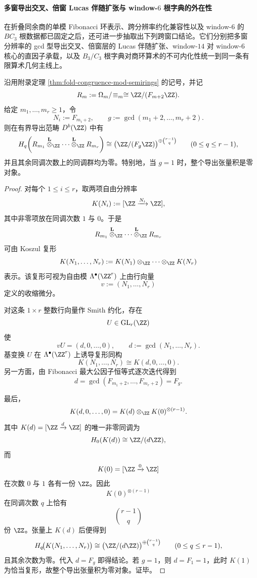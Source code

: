 \paragraph{多窗导出交叉、倍窗 Lucas 伴随扩张与 window-\texorpdfstring{$6$}{6} 根字典的外在性}
在折叠同余商的单模 Fibonacci 环表示、跨分辨率约化兼容性以及 window-\(6\) 的 \(BC_3\) 根数据都已固定之后，还可进一步抽取出下列跨窗口结论。它们分别把多窗分辨率的 gcd 型导出交叉、倍窗层的 Lucas 伴随扩张、window-\(14\) 对 window-\(6\) 核心的直因子承载，以及 \(B_3/C_3\) 根字典对商环算术的不可内化性统一到同一条有限算术几何主线上。

\begin{theorem}[多窗折叠同余商的导出交叉公式]\label{thm:xi-time-part51aa-derived-cross-fib-gcd-formula}
沿用附录定理 \ref{thm:fold-congruence-mod-semirings} 的记号，并记
\[
R_m:=\Omega_m/\!\equiv_m\cong \ZZ/(F_{m+2}\ZZ).
\]
给定 \(m_1,\dots,m_r\ge 1\)，令
\[
N_i:=F_{m_i+2},
\qquad
g:=\gcd(m_1+2,\dots,m_r+2).
\]
则在有界导出范畴 \(D^b(\ZZ)\) 中有
\[
H_q\!\left(
R_{m_1}\overset{\mathbf L}{\otimes}_{\ZZ}\cdots
\overset{\mathbf L}{\otimes}_{\ZZ}R_{m_r}
\right)
\cong
\bigl(\ZZ/(F_g\ZZ)\bigr)^{\oplus \binom{r-1}{q}}
\qquad(0\le q\le r-1),
\]
并且其余同调次数上的同调群均为零。特别地，当 \(g=1\) 时，整个导出张量积是零对象。
\end{theorem}
\begin{proof}
对每个 \(1\le i\le r\)，取两项自由分辨率
\[
K(N_i):=[\ZZ\xrightarrow{N_i}\ZZ],
\]
其中非零项放在同调次数 \(1\) 与 \(0\)。于是
\[
R_{m_1}\overset{\mathbf L}{\otimes}_{\ZZ}\cdots
\overset{\mathbf L}{\otimes}_{\ZZ}R_{m_r}
\]
可由 Koszul 复形
\[
K(N_1,\dots,N_r):=
K(N_1)\otimes_{\ZZ}\cdots\otimes_{\ZZ}K(N_r)
\]
表示。该复形可视为自由模 \(\Lambda^\bullet(\ZZ^r)\) 上由行向量
\[
v:=(N_1,\dots,N_r)
\]
定义的收缩微分。

对这条 \(1\times r\) 整数行向量作 Smith 约化，存在
\[
U\in \mathrm{GL}_r(\ZZ)
\]
使
\[
vU=(d,0,\dots,0),
\qquad
d:=\gcd(N_1,\dots,N_r).
\]
基变换 \(U\) 在 \(\Lambda^\bullet(\ZZ^r)\) 上诱导复形同构
\[
K(N_1,\dots,N_r)\cong K(d,0,\dots,0).
\]
另一方面，由 Fibonacci 最大公因子恒等式逐次迭代得到
\[
d
=
\gcd(F_{m_1+2},\dots,F_{m_r+2})
=
F_g.
\]

最后，
\[
K(d,0,\dots,0)=K(d)\otimes_{\ZZ}K(0)^{\otimes(r-1)}.
\]
其中 \(K(d)=[\ZZ\xrightarrow{d}\ZZ]\) 的唯一非零同调为
\[
H_0(K(d))\cong \ZZ/(d\ZZ),
\]
而
\[
K(0)=[\ZZ\xrightarrow{0}\ZZ]
\]
在次数 \(0\) 与 \(1\) 各有一份 \(\ZZ\)。因此
\[
K(0)^{\otimes(r-1)}
\]
在同调次数 \(q\) 上恰有
\[
\binom{r-1}{q}
\]
份 \(\ZZ\)。张量上 \(K(d)\) 后便得到
\[
H_q\!\bigl(K(N_1,\dots,N_r)\bigr)
\cong
\bigl(\ZZ/(d\ZZ)\bigr)^{\oplus \binom{r-1}{q}}
\qquad(0\le q\le r-1),
\]
且其余次数为零。代入 \(d=F_g\) 即得结论。若 \(g=1\)，则 \(d=F_1=1\)，此时 \(K(1)\) 为恰当复形，故整个导出张量积为零对象。证毕。
\end{proof}

